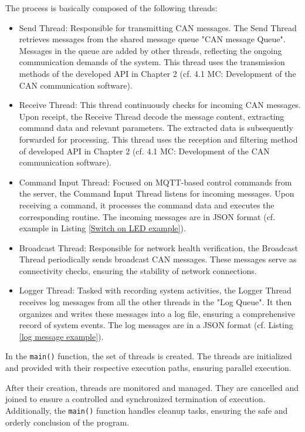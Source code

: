 The process is basically composed of the following threads:
\begin{itemize}
    \item Send Thread: Responsible for transmitting CAN messages. The Send Thread retrieves messages from the shared message queue "CAN message Queue". Messages in the queue are added by other threads, reflecting the ongoing communication demands of the system. This thread uses the transmission methods of the developed API in Chapter 2 (cf. 4.1 MC: Development of the CAN communication software).
    \item Receive Thread: This thread continuously checks for incoming CAN messages. Upon receipt, the Receive Thread decode the message content, extracting command data and relevant parameters. The extracted data is subsequently forwarded for processing. This thread uses the reception and filtering method of developed API in Chapter 2 (cf. 4.1 MC: Development of the CAN communication software).
    \item Command Input Thread: Focused on MQTT-based control commands from the server, the Command Input Thread listens for incoming messages. Upon receiving a command, it processes the command data and executes the corresponding routine. The incoming messages are in JSON format (cf. example in Listing \ref{Switch on LED example}).
    \item Broadcast Thread: Responsible for network health verification, the Broadcast Thread periodically sends broadcast CAN messages. These messages serve as connectivity checks, ensuring the stability of network connections.
    \item Logger Thread: Tasked with recording system activities, the Logger Thread receives log messages from all the other threads in the "Log Queue". It then organizes and writes these messages into a log file, ensuring a comprehensive record of system events. The log messages are in a JSON format (cf. Listing \ref{log message example}).
\end{itemize}

In the \texttt{main()} function, the set of threads is created. The threads are initialized and provided with their respective execution paths, ensuring parallel execution.

After their creation, threads are monitored and managed. They are cancelled and joined to ensure a controlled and synchronized termination of execution. Additionally, the \texttt{main()} function handles cleanup tasks, ensuring the safe and orderly conclusion of the program.

